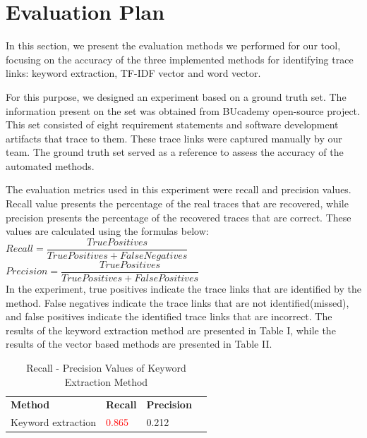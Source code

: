\documentclass[conference]{IEEEtran}
\begin{document}
\section{Evaluation Plan}
\label{section:evaluation}


In this section, we present the evaluation methods we performed for our tool, focusing on the accuracy of the three implemented methods for identifying trace links: keyword extraction, TF-IDF vector and word vector.

For this purpose, we designed an experiment based on a ground truth set. The information present on the set was obtained from BUcademy\cite{bounswe-bucademy} open-source project. This set consisted of eight requirement statements and software development artifacts that trace to them. These trace links were captured manually by our team. The ground truth set served as a reference to assess the accuracy of the automated methods. 

The evaluation metrics used in this experiment were recall and precision values. Recall value presents the percentage of the real traces that are recovered, while precision presents the percentage of the recovered traces that are correct. These values are calculated using the formulas below:
\\

$Recall = \dfrac{True Positives}{True Positives + False Negatives}$
\\

$Precision = \dfrac{True Positives}{True Positives + False Positives}$
\\

In the experiment, true positives indicate the trace links that are identified by the method. False negatives indicate the trace links that are not identified(missed), and false positives indicate the identified trace links that are incorrect. The results of the keyword extraction method are presented in Table I, while the results of the vector based methods are presented in Table II.


\begin{table}[htb]
\centering
\vspace{1ex}
\begin{tabular}{l l l l}
\textbf{Method} & \textbf{Recall} & \textbf{Precision}\\

Keyword extraction & \textcolor{red}{0.865} & 0.212 \\

\end{tabular}
\caption{Recall - Precision Values of Keyword Extraction Method}
\end{table}
\end{document}
